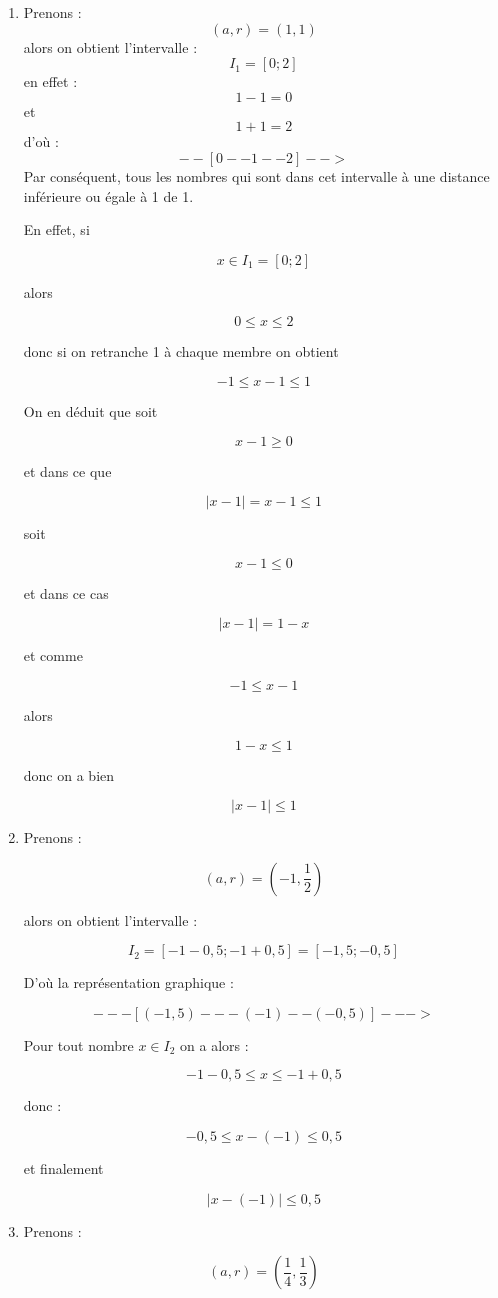\documentclass[a4paper,11pt]{book}
\begin{document}
\begin{enumerate}
\item Prenons :
\[(a, r) = (1,1)\]
alors on obtient l'intervalle :
\[I_1 = [0 ; 2]\]
en effet :
\[1 - 1 = 0\]
et \[1 + 1 = 2\]
d'où :
\[--[0--1--2]-->\]
Par conséquent, tous les nombres qui sont dans cet intervalle à une
distance inférieure ou égale à 1 de 1.

En effet, si

\[x\in I_1 = [0 ; 2]\]

alors

\[0\leq x\leq 2\]

donc si on retranche 1 à chaque membre on obtient

\[-1\leq x - 1\leq 1\]

On en déduit que soit

\[x - 1 \geq 0\]

et dans ce que

\[\lvert x - 1\rvert = x - 1\leq 1\]

soit

\[x - 1 \leq 0\]

et dans ce cas

\[\lvert x - 1\rvert = 1 - x\]

et comme

\[-1\leq x - 1\]

alors

\[1 - x\leq 1\]

donc on a bien

\[\vert x - 1\vert \leq 1\]

\item Prenons :

\[(a, r) = \left(-1,\dfrac{1}{2}\right)\]

alors on obtient l'intervalle :

\[I_2 = [-1 - 0,5 ; -1 + 0,5] = [-1,5 ; -0,5]\]

D'où la représentation graphique :

\[---[(-1,5)---(-1)--(-0,5)]--->\]

Pour tout nombre \(x\in I_2\) on a alors :

\[-1 - 0,5 \leq x \leq -1 + 0,5\]

donc :

\[-0,5\leq x - (-1)\leq 0,5\]

et finalement

\[\vert x - (-1)\vert\leq 0,5\]

\item Prenons :

\[(a, r) = \left(\dfrac{1}{4},\dfrac{1}{3}\right)\]


\end{enumerate}
\end{document}

